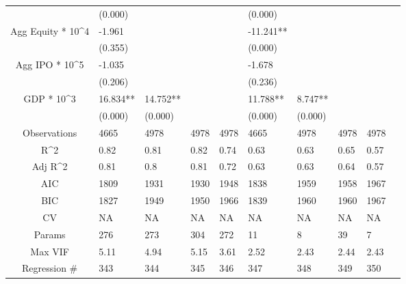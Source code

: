 \documentclass{article}
\begin{document}
\begin{table}[H]
\begin{tabular}{|clllllllll|}
   & (0.000) &  &  &  & (0.000) &  &  &  & \\
  Agg Equity * 10^4 & -1.961 &  &  &  & -11.241** &  &  &  & \\
   & (0.355) &  &  &  & (0.000) &  &  &  & \\
  Agg IPO * 10^5 & -1.035 &  &  &  & -1.678 &  &  &  & \\
   & (0.206) &  &  &  & (0.236) &  &  &  & \\
  GDP * 10^3 & 16.834** & 14.752** &  &  & 11.788** & 8.747** &  &  & \\
   & (0.000) & (0.000) &  &  & (0.000) & (0.000) &  &  & \\
  \hline
 Observations & 4665 & 4978 & 4978 & 4978 & 4665 & 4978 & 4978 & 4978 & \\
  R^2 & 0.82 & 0.81 & 0.82 & 0.74 & 0.63 & 0.63 & 0.65 & 0.57 & \\
  Adj R^2 & 0.81 & 0.8 & 0.81 & 0.72 & 0.63 & 0.63 & 0.64 & 0.57 & \\
  AIC & 1809 & 1931 & 1930 & 1948 & 1838 & 1959 & 1958 & 1967 & \\
  BIC & 1827 & 1949 & 1950 & 1966 & 1839 & 1960 & 1960 & 1967 & \\
  CV & NA & NA & NA & NA & NA & NA & NA & NA & \\
  Params & 276 & 273 & 304 & 272 & 11 & 8 & 39 & 7 & \\
  Max VIF & 5.11 & 4.94 & 5.15 & 3.61 & 2.52 & 2.43 & 2.44 & 2.43 & \\
  Regression \# & 343 & 344 & 345 & 346 & 347 & 348 & 349 & 350 & \\
   \hline
\end{tabular}

\end{table}
\end{document}
